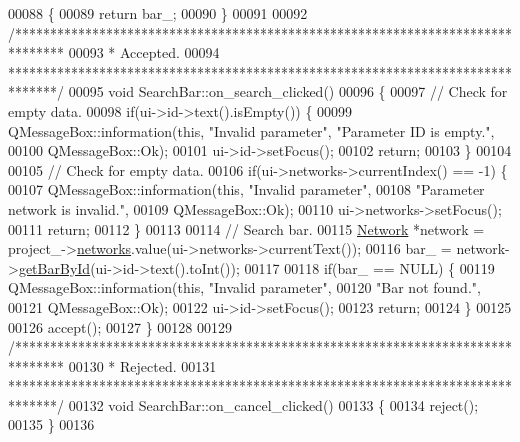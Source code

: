 \begin{DoxyCode}
00088 \{
00089   \textcolor{keywordflow}{return} bar\_;
00090 \}
00091 
00092 \textcolor{comment}{/*******************************************************************************}
00093 \textcolor{comment}{* Accepted.}
00094 \textcolor{comment}{*******************************************************************************/}
00095 \textcolor{keywordtype}{void} SearchBar::on\_search\_clicked()
00096 \{
00097   \textcolor{comment}{// Check for empty data.}
00098   \textcolor{keywordflow}{if}(ui->id->text().isEmpty()) \{
00099     QMessageBox::information(\textcolor{keyword}{this}, \textcolor{stringliteral}{"Invalid parameter"}, \textcolor{stringliteral}{"Parameter ID is empty."},
00100                              QMessageBox::Ok);
00101     ui->id->setFocus();
00102     \textcolor{keywordflow}{return};
00103   \}
00104 
00105   \textcolor{comment}{// Check for empty data.}
00106   \textcolor{keywordflow}{if}(ui->networks->currentIndex() == -1) \{
00107     QMessageBox::information(\textcolor{keyword}{this}, \textcolor{stringliteral}{"Invalid parameter"},
00108                              \textcolor{stringliteral}{"Parameter network is invalid."},
00109                              QMessageBox::Ok);
00110     ui->networks->setFocus();
00111     \textcolor{keywordflow}{return};
00112   \}
00113 
00114   \textcolor{comment}{// Search bar.}
00115   \hyperlink{class_network}{Network} *network = project\_->\hyperlink{class_project_aa98126154cab59769a431668e6f17daf}{networks}.value(ui->networks->currentText());
00116   bar\_ = network->\hyperlink{group___models_ga04d524ce0fa0dd0d06deda92b1597af0}{getBarById}(ui->id->text().toInt());
00117 
00118   \textcolor{keywordflow}{if}(bar\_ == NULL) \{
00119     QMessageBox::information(\textcolor{keyword}{this}, \textcolor{stringliteral}{"Invalid parameter"},
00120                              \textcolor{stringliteral}{"Bar not found."},
00121                              QMessageBox::Ok);
00122     ui->id->setFocus();
00123     \textcolor{keywordflow}{return};
00124   \}
00125 
00126   accept();
00127 \}
00128 
00129 \textcolor{comment}{/*******************************************************************************}
00130 \textcolor{comment}{* Rejected.}
00131 \textcolor{comment}{*******************************************************************************/}
00132 \textcolor{keywordtype}{void} SearchBar::on\_cancel\_clicked()
00133 \{
00134   reject();
00135 \}
00136 
\end{DoxyCode}

